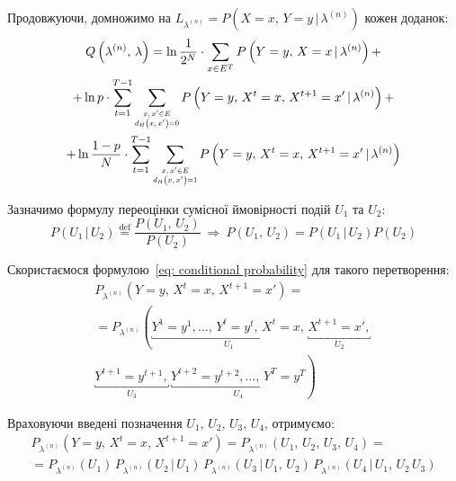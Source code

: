 Продовжуючи, домножимо на $L_{\lambda^{(n)}}=P\left( X=x,\, Y=y \,|\, \lambda^{(n)} \right)$ кожен доданок:
\begin{multline*}
    Q\left( \lambda^{(n)},\,\lambda \right) = \ln\frac{1}{2^N} \cdot \sum\limits_{x \in E^T} P\left( Y=y,\, X=x \,|\, \lambda^{(n)} \right) + \\
    + \ln p \cdot \sum\limits_{t=1}^{T-1} \sum\limits_{\scaleq[0.8]{\substack{x,\,x' \in E \\ d_H\left( x,\,x' \right) = 0}}} P\left( Y=y,\, X^t=x,\, X^{t+1}=x' \,|\, \lambda^{(n)} \right) + \\
    + \ln\frac{1-p}{N} \cdot \sum\limits_{t=1}^{T-1} \sum\limits_{\scaleq[0.8]{\substack{x,\,x' \in E \\ d_H\left( x,\,x' \right) = 1}}} P\left( Y=y,\, X^t=x,\, X^{t+1}=x' \,|\, \lambda^{(n)} \right)
\end{multline*}

Зазначимо формулу переоцінки сумісної ймовірності подій $U_1$ та $U_2:$
\begin{equation}\label{eq: conditional probability}
    P\left( U_1 \,|\, U_2 \right) \overset{\mathrm{def}}{=} \frac{P\left( U_1,\,U_2 \right)}{P(U_2)}\ \Rightarrow\ P\left( U_1,\,U_2 \right) = P\left( U_1 \,|\, U_2 \right) P(U_2)
\end{equation}

Скористаємося формулою~\eqref{eq: conditional probability} для такого перетворення:
\begin{multline*}
    P_{\lambda^{(n)}} \left( Y=y,\, X^t=x,\, X^{t+1}=x' \right) = \\
    = P_{\lambda^{(n)}} \left( \underbracket{Y^1=y^1,\ldots,\,Y^t=y^t,\,X^t=x,}_{U_1}\, \underbracket{X^{t+1}=x',}_{U_2}\, \right. \\
    \left. \underbracket{Y^{t+1}=y^{t+1},}_{U_3}\, \underbracket{Y^{t+2}=y^{t+2},\ldots,\,Y^{T}=y^{T}}_{U_4} \right)
\end{multline*}

Враховуючи введені позначення $U_1,\,U_2,\,U_3,\,U_4$, отримуємо:
\begin{multline*}
    P_{\lambda^{(n)}} \left( Y=y,\, X^t=x,\, X^{t+1}=x' \right) = P_{\lambda^{(n)}} \left( U_1,\,U_2,\,U_3,\,U_4 \right) = \\ 
    = P_{\lambda^{(n)}} \left( U_1 \right)\, P_{\lambda^{(n)}} \left( U_2 \,|\, U_1 \right)\, P_{\lambda^{(n)}} \left( U_3 \,|\, U_1,\,U_2 \right)\, P_{\lambda^{(n)}} \left( U_4 \,|\, U_1,\,U_2\,U_3 \right)
\end{multline*}

